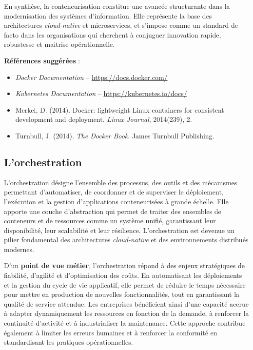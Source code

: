 En synthèse, la conteneurisation constitue une avancée structurante dans la modernisation des systèmes d’information. Elle représente la base des architectures \textit{cloud-native} et microservices, et s’impose comme un standard de facto dans les organisations qui cherchent à conjuguer innovation rapide, robustesse et maitrise opérationnelle.

\textbf{Références suggérées} :
\begin{itemize}
	\item \textit{Docker Documentation} – \url{https://docs.docker.com/}
	\item \textit{Kubernetes Documentation} – \url{https://kubernetes.io/docs/}
	\item Merkel, D. (2014). Docker: lightweight Linux containers for consistent development and deployment. \textit{Linux Journal}, 2014(239), 2.
	\item Turnbull, J. (2014). \textit{The Docker Book}. James Turnbull Publishing.
\end{itemize}

\subsection{L’orchestration}

L’orchestration désigne l’ensemble des processus, des outils et des mécanismes permettant d’automatiser, de coordonner et de superviser le déploiement, l’exécution et la gestion d’applications conteneurisées à grande échelle. Elle apporte une couche d’abstraction qui permet de traiter des ensembles de conteneurs et de ressources comme un système unifié, garantissant leur disponibilité, leur scalabilité et leur résilience. L’orchestration est devenue un pilier fondamental des architectures \textit{cloud-native} et des environnements distribués modernes.

D’un \textbf{point de vue métier}, l’orchestration répond à des enjeux stratégiques de fiabilité, d’agilité et d’optimisation des coûts. En automatisant les déploiements et la gestion du cycle de vie applicatif, elle permet de réduire le temps nécessaire pour mettre en production de nouvelles fonctionnalités, tout en garantissant la qualité de service attendue. Les entreprises bénéficient ainsi d’une capacité accrue à adapter dynamiquement les ressources en fonction de la demande, à renforcer la continuité d’activité et à industrialiser la maintenance. Cette approche contribue également à limiter les erreurs humaines et à renforcer la conformité en standardisant les pratiques opérationnelles.

